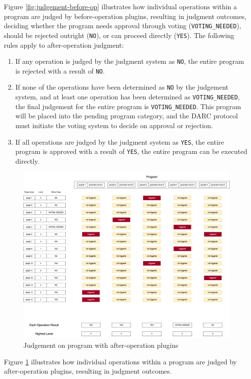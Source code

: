\documentclass[main.tex]{subfiles}
\begin{document}
Figure \ref{fig:judgement-before-op} illustrates how individual operations within a program are judged by before-operation plugins, resulting in judgment outcomes, deciding whether the program needs approval through voting (\texttt{VOTING\_NEEDED}), should be rejected outright (\texttt{NO}), or can proceed directly (\texttt{YES}). The following rules apply to after-operation judgment:

\begin{enumerate}
    \item If any operation is judged by the judgment system as \texttt{NO}, the entire program is rejected with a result of \texttt{NO}.
    \item If none of the operations have been determined as \texttt{NO} by the judgement system, and at least one operation has been determined as \texttt{VOTING\_NEEDED}, the final judgement for the entire program is \texttt{VOTING\_NEEDED}. This program will be placed into the pending program category, and the DARC protocol must initiate the voting system to decide on approval or rejection.
    \item If all operations are judged by the judgment system as \texttt{YES}, the entire program is approved with a result of \texttt{YES}, the entire program can be executed directly.
\end{enumerate}


\begin{figure}
    \centering
    \includegraphics[width=1\linewidth]{judgement_plugin_levels_after_ops.drawio.png}
    \caption{\label{fig:judgement-after-op}Judgement on program with after-operation plugins}
\end{figure}

Figure \ref{fig:judgement-after-op} illustrates how individual operations within a program are judged by after-operation plugins, resulting in judgment outcomes.
\end{document}
